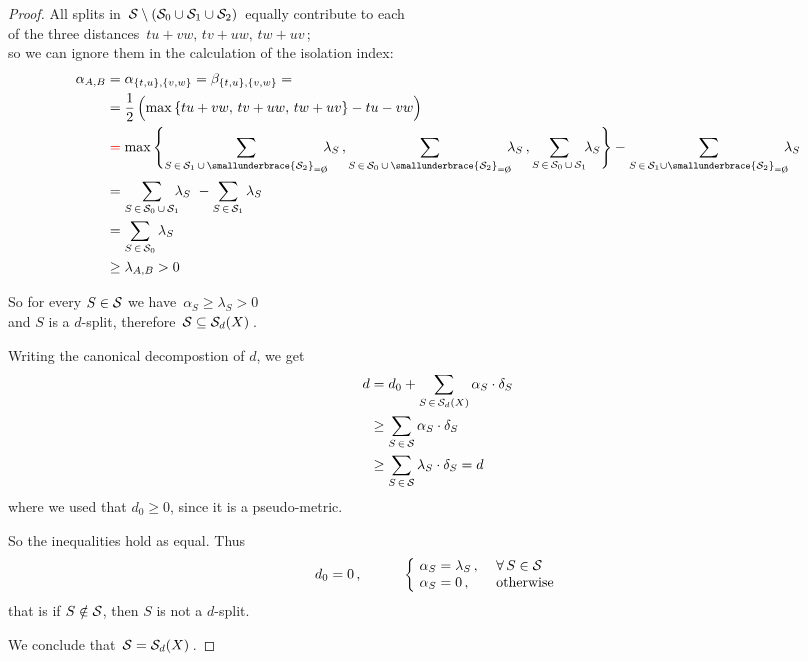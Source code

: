 \documentclass[./main.tex]{subfiles}
\begin{document}
\begin{proof}
    All splits in $\, {\mathcal{S}} \setminus ({\mathcal{S}}_0 \cup {\mathcal{S}}_1 \cup {\mathcal{S}}_2) \,$  equally contribute to each \\
    \bsp of the three distances $\, tu + vw,\, tv + uw,\, tw + uv \,$; \\
    so we can ignore them in the calculation of the isolation index:
    \begingroup \eqspace{0pt}{\bigskipamount}
    \begin{align*}
        \aAB &= \alpha_{\{t,u\},\{v,w\}} = \beta_{\{t,u\},\{v,w\}} = \\
        &= \frac{1}{2}\, \Bigl( \max {\{ tu + vw,\, tv + uw,\, tw + uv \}} - tu - vw \Bigr) \\
        &\mathcolor{red}{=} \max {\Biggl\{ 
            \sum_{S \,\in\, \Sc_1 \,\cup\, \smallunderbrace{\scriptstyle\Sc_2}_{=\emptyset}}\!\!\! \lambda_S \,,
            \sum_{S \,\in\, \Sc_0 \,\cup\, \smallunderbrace{\scriptstyle\Sc_2}_{=\emptyset}}\!\!\! \lambda_S \,,
            \sum_{S \,\in\, \Sc_0 \,\cup\, \Sc_1}\!\! \lambda_S \Biggr\}}
            - \sum_{S \,\in\, \Sc_1 \cup \smallunderbrace{\scriptstyle\Sc_2}_{=\emptyset}}\!\!\! \lambda_S \\
        &= \sum_{S \,\in\, \Sc_0 \,\cup\, \Sc_1}\!\!\! \lambda_S \ 
        - \sum_{S \,\in\, \Sc_1} \lambda_S \\
        &= \sum_{S \,\in\, \Sc_0} \lambda_S \\
        &\geq \lambda_{A,B} > 0
    \end{align*}
    \endgroup

    So for every $S \in {\mathcal{S}}$ we have $\, \alpha_S \geq \lambda_S > 0 \,$ \\
    \bsp and $S$ is a $d$-split, therefore $\, {\mathcal{S}}\subseteq{\mathcal{S}}_d(X) \,$.

    Writing the canonical decompostion of $d$, we get
    \begin{align*}
        d &= d_0 + \sum_{S \,\in\, {\mathcal{S}}_d(X)} \alpha_S \cdot \delta_S \\
        &\geq \sum_{S \,\in\, {\mathcal{S}}} \alpha_S \cdot \delta_S \\
        &\geq \sum_{S \,\in\, {\mathcal{S}}} \lambda_S \cdot \delta_S = d
    \end{align*}
    where we used that $d_0 \geq 0$, since it is a pseudo-metric.
    
    So the inequalities hold as equal. Thus
    \[ d_0 = 0 \,, \qquad \quad \bigg\{\!
        \begin{array}{ll}
            \alpha_S = \lambda_S \,,    & \ \forall\, S \in {\mathcal{S}} \\
            \alpha_S = 0 \,,            & \ \text{otherwise}
        \end{array}
    \]
    that is if $S \notin {\mathcal{S}}$, then $S$ is not a $d$-split.

    We conclude that $\, {\mathcal{S}} = {\mathcal{S}}_d(X) \,$. \qedhere
\end{proof}
\end{document}
